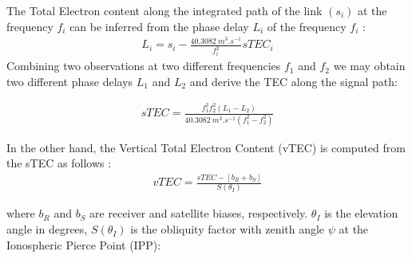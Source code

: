 %      
%      
%      


  The Total Electron content along the integrated path of the link $(s_i)$ at the frequency $f_i$ can be inferred from the phase delay $L_i$ of the frequency $f_i$ \citep{Emery:2017}:
  \begin{align}
    L_i = s_i - \frac{\SI{40.3082}{m^3.s^{-1}}}{f_i^2}sTEC_i
  \end{align}
  Combining two observations at two different frequencies $f_1$ and $f_2$ we may obtain two different phase delays $L_1$ and $L_2$ and derive the TEC along the signal path:

  \begin{align}
    sTEC = \frac{f_1^2f_2^2\left(L_1-L_2\right)}{\SI{40.3082}{m^3.s^{-1}}\left(f_1^2-f_2^2\right)}
  \end{align}

  In the other hand, the Vertical Total Electron Content (vTEC) is computed from the sTEC as follows \citep{Kumar:2012}:
  \begin{align}
    vTEC = \frac{sTEC-\left[b_R+b_S\right]}{S(\theta_I)}
  \end{align}

  where $b_R$ and $b_S$ are receiver and satellite biases, respectively. $\theta_I$ is the elevation angle in degrees, $S(\theta_I)$ is the obliquity factor with zenith angle $\psi$ at the Ionospheric Pierce Point (IPP):

